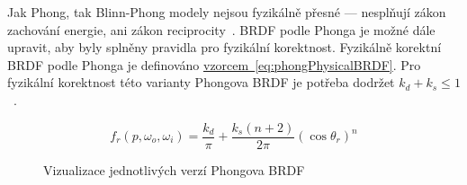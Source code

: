 \documentclass[czech,master]{diploma}
\newcommand{\point}{p}
\newcommand{\brdf}{f_r\left(\point,\omega_{o},\omega_{i}\right)}
\begin{document}
Jak Phong, tak Blinn-Phong modely nejsou fyzikálně přesné --- nesplňují zákon zachování energie, ani zákon reciprocity~\cite{BRDFOverview}. BRDF podle Phonga je možné dále upravit, aby byly splněny pravidla pro fyzikální korektnost. Fyzikálně korektní BRDF podle Phonga je definováno \hyperref[eq:phongPhysicalBRDF]{vzorcem~\ref{eq:phongPhysicalBRDF}}. Pro fyzikální korektnost této varianty Phongova BRDF je potřeba dodržet \(k_d + k_s \leq 1\)~\cite{LaFortunePhongBRDF}.

\begin{equation} \label{eq:phongPhysicalBRDF}
  \brdf = \frac{k_d}{\pi} +
  \frac{k_s\left(n+2\right)}{2\pi}{\left(\cos\theta_r\right)}^{n}
\end{equation}

\begin{figure}[ht]%
  \centering
  \qquad
  \qquad
  \caption{Vizualizace jednotlivých verzí Phongova BRDF}%
  \label{fig:phongBRDFRender}%
\end{figure}
\end{document}
